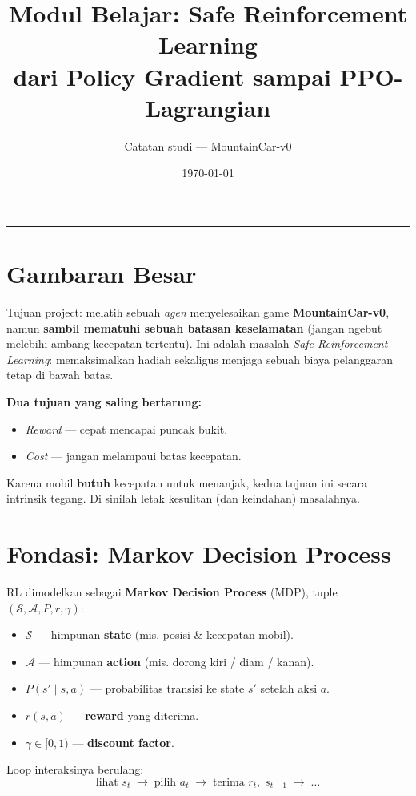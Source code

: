 \documentclass[11pt,a4paper]{article}
\title{\textbf{Modul Belajar: Safe Reinforcement Learning\\ dari Policy Gradient sampai PPO-Lagrangian}}
\author{Catatan studi --- MountainCar-v0}
\date{\today}
\begin{document}
\maketitle
\tableofcontents
\bigskip
\hrule
\bigskip

\section{Gambaran Besar}

Tujuan project: melatih sebuah \emph{agen} menyelesaikan game \textbf{MountainCar-v0},
namun \textbf{sambil mematuhi sebuah batasan keselamatan} (jangan ngebut melebihi
ambang kecepatan tertentu). Ini adalah masalah \emph{Safe Reinforcement Learning}:
memaksimalkan hadiah sekaligus menjaga sebuah biaya pelanggaran tetap di bawah batas.

\begin{intuisi}
\textbf{Dua tujuan yang saling bertarung:}
\begin{itemize}[nosep]
  \item \emph{Reward} --- cepat mencapai puncak bukit.
  \item \emph{Cost} --- jangan melampaui batas kecepatan.
\end{itemize}
Karena mobil \textbf{butuh} kecepatan untuk menanjak, kedua tujuan ini secara
intrinsik tegang. Di sinilah letak kesulitan (dan keindahan) masalahnya.
\end{intuisi}

\section{Fondasi: Markov Decision Process}

RL dimodelkan sebagai \textbf{Markov Decision Process} (MDP), tuple
$(\mathcal{S}, \mathcal{A}, P, r, \gamma)$:
\begin{itemize}[nosep]
  \item $\mathcal{S}$ --- himpunan \textbf{state} (mis. posisi \& kecepatan mobil).
  \item $\mathcal{A}$ --- himpunan \textbf{action} (mis. dorong kiri / diam / kanan).
  \item $P(s'\mid s,a)$ --- probabilitas transisi ke state $s'$ setelah aksi $a$.
  \item $r(s,a)$ --- \textbf{reward} yang diterima.
  \item $\gamma \in [0,1)$ --- \textbf{discount factor}.
\end{itemize}

Loop interaksinya berulang:
\[ \text{lihat } s_t \;\longrightarrow\; \text{pilih } a_t \;\longrightarrow\; \text{terima } r_t,\; s_{t+1} \;\longrightarrow\; \dots \]
\end{document}
